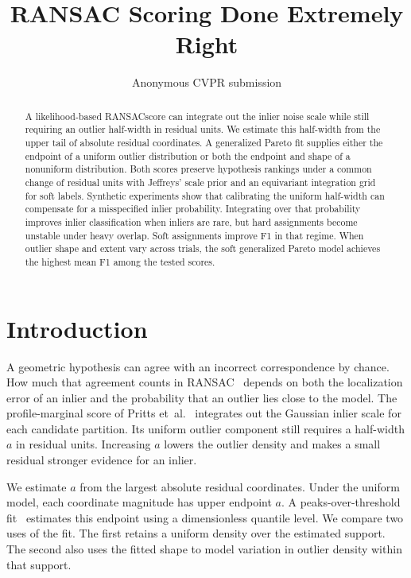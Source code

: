\documentclass[10pt,twocolumn,letterpaper]{article}
\title{RANSAC Scoring Done Extremely Right}
\author{Anonymous CVPR submission}
\newcommand{\mname}[1]{\texorpdfstring{#1\xspace}{#1}}
\newcommand{\ransac}{\mname{RANSAC}}
\begin{document}
\maketitle
\begin{abstract}
A likelihood-based \ransac score can integrate out the inlier noise scale
while still requiring an outlier half-width in residual units. We estimate
this half-width from the upper tail of absolute residual coordinates.
A generalized Pareto fit supplies either the endpoint of a uniform
outlier distribution or both the endpoint and shape of a nonuniform
distribution. Both scores preserve hypothesis rankings under a common
change of residual units with Jeffreys' scale prior and an equivariant
integration grid for soft labels. Synthetic experiments show that
calibrating the uniform half-width can compensate for a misspecified
inlier probability. Integrating over that probability improves inlier
classification when inliers are rare, but hard assignments become
unstable under heavy overlap. Soft assignments improve F1 in that
regime. When outlier shape and extent vary across trials, the soft
generalized Pareto model achieves the highest mean F1 among the tested scores.
\end{abstract}

\section{Introduction}
\label{sec:intro}

A geometric hypothesis can agree with an incorrect correspondence by
chance. How much that agreement counts in \ransac~\cite{Fischler1981}
depends on both the localization error of an inlier and the probability
that an outlier lies close to the model. The profile-marginal score
of Pritts et~al.~\cite{Pritts2026} integrates out the Gaussian inlier
scale for each candidate partition. Its uniform outlier component still
requires a half-width $a$ in residual units. Increasing $a$ lowers the
outlier density and makes a small residual stronger evidence for an inlier.

We estimate $a$ from the largest absolute residual coordinates. Under
the uniform model, each coordinate magnitude has upper endpoint $a$.
A peaks-over-threshold fit~\cite{Balkema1974,Pickands1975,Coles2001}
estimates this endpoint using a dimensionless quantile level. We compare
two uses of the fit. The first retains a uniform density over the
estimated support. The second also uses the fitted shape to model
variation in outlier density within that support.
\end{document}
